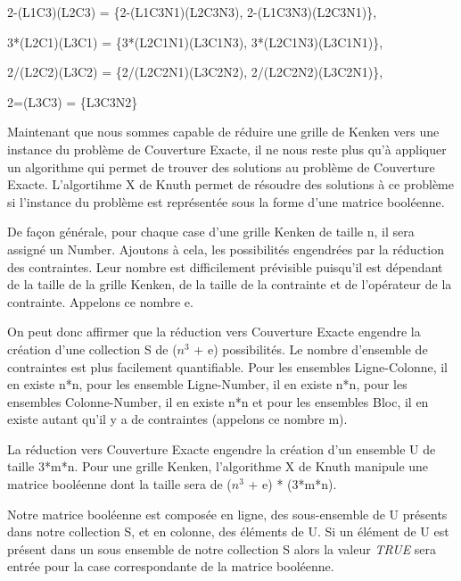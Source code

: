 \documentclass[1]{report}
\begin{document}
    2-(L1C3)(L2C3) = \{2-(L1C3N1)(L2C3N3), 2-(L1C3N3)(L2C3N1)\},
    
    3*(L2C1)(L3C1) = \{3*(L2C1N1)(L3C1N3), 3*(L2C1N3)(L3C1N1)\},
    
    2/(L2C2)(L3C2) = \{2/(L2C2N1)(L3C2N2), 2/(L2C2N2)(L3C2N1)\},
    
    2=(L3C3) = \{L3C3N2\} \newline
    
    Maintenant que nous sommes capable de réduire une grille de Kenken vers une instance du problème de Couverture Exacte, il ne nous reste plus qu'à appliquer un algorithme qui permet de trouver des solutions au problème de Couverture Exacte. L'algortihme X de Knuth permet de résoudre des solutions à ce problème si l'instance du problème est représentée sous la forme d'une matrice booléenne. \newline
    
    De façon générale, pour chaque case d'une grille Kenken de taille n, il sera assigné un Number. Ajoutons à cela, les possibilités engendrées par la réduction des contraintes. Leur nombre est difficilement prévisible puisqu'il est dépendant de la taille de la grille Kenken, de la taille de la contrainte et de l'opérateur de la contrainte. Appelons ce nombre e. \newline
    
    On peut donc affirmer que la réduction vers Couverture Exacte engendre la création d'une collection S de ($n^{3}$ + e) possibilités. Le nombre d'ensemble de contraintes est plus facilement quantifiable. Pour les ensembles Ligne-Colonne, il en existe n*n, pour les ensemble Ligne-Number, il en existe n*n, pour les ensembles Colonne-Number, il en existe n*n et pour les ensembles Bloc, il en existe autant qu'il y a de contraintes (appelons ce nombre m). \newline
    
    La réduction vers Couverture Exacte engendre la création d'un ensemble U de taille 3*m*n. Pour une grille Kenken, l'algorithme X de Knuth manipule une matrice booléenne dont la taille sera de ($n^{3}$ + e) * (3*m*n). \newline
    
    Notre matrice booléenne est composée en ligne, des sous-ensemble de U présents dans notre collection S, et en colonne, des éléments de U. Si un élément de U est présent dans un sous ensemble de notre collection S alors la valeur \textit{TRUE} sera entrée pour la case correspondante de la matrice booléenne. \newline
    
\end{document}
